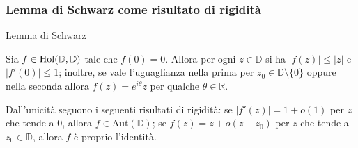 \begin{frame}
  \frametitle{Lemma di Schwarz come risultato di rigidità}
  \begin{block}{Lemma di Schwarz}
    \begin{itshape}
      Sia $f \in \text{\normalfont{Hol}}(\mathbb{D},\mathbb{D})$ tale che $f(0)=0$. Allora per ogni $z \in \mathbb{D}$ si ha $|f(z)| \le |z|$ e $|f'(0)| \le 1$; inoltre, se vale l'uguaglianza nella prima per $z_0 \in \mathbb{D}\setminus\{0\}$ oppure nella seconda allora $f(z)=e^{i\theta}z$ per qualche $\theta \in \mathbb{R}$.
    \end{itshape}
  \end{block}
  \pause
  \begin{oss}
    Dall'unicità seguono i seguenti risultati di rigidità: se $|f'(z)|=1+o(1)$ per $z$ che tende a $0$, allora $f \in \text{Aut}(\mathbb{D})$; se $f(z)=z+o(z-z_0)$ per $z$ che tende a $z_0 \in \mathbb{D}$, allora $f$ è proprio l'identità.
  \end{oss}
\end{frame}

